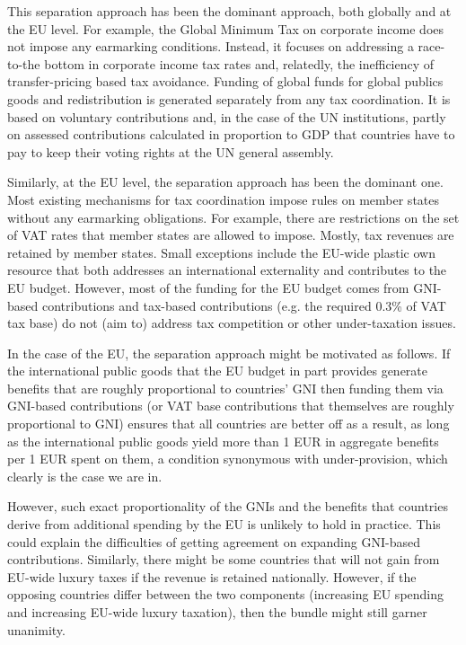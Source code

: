 \documentclass{article}
\begin{document}
This separation approach has been the dominant approach, both globally and at the EU level. For example, the Global Minimum Tax on corporate income does not impose any earmarking conditions. Instead, it focuses on addressing a race-to-the bottom in corporate income tax rates and, relatedly, the inefficiency of transfer-pricing based tax avoidance. Funding of global funds for global publics goods and redistribution is generated separately from any tax coordination. It is based on voluntary contributions and, in the case of the UN institutions, partly on assessed contributions calculated in proportion to GDP that countries have to pay to keep their voting rights at the UN general assembly.

Similarly, at the EU level, the separation approach has been the dominant one. Most existing mechanisms for tax coordination impose rules on member states without any earmarking obligations. For example, there are restrictions on the set of VAT rates that member states are allowed to impose. Mostly, tax revenues are retained by member states. Small exceptions include the EU-wide plastic own resource that both addresses an international externality and contributes to the EU budget. However, most of the funding for the EU budget comes from GNI-based contributions and tax-based contributions (e.g. the required 0.3\% of VAT tax base) do not (aim to) address tax competition or other under-taxation issues.

In the case of the EU, the separation approach might be motivated as follows. If the international public goods that the EU budget in part provides generate benefits that are roughly proportional to countries' GNI then funding them via GNI-based contributions (or VAT base contributions that themselves are roughly proportional to GNI) ensures that all countries are better off as a result, as long as the international public goods yield more than 1 EUR in aggregate benefits per 1 EUR spent on them, a condition synonymous with under-provision, which clearly is the case we are in.

However, such exact proportionality of the GNIs and the benefits that countries derive from additional spending by the EU is unlikely to hold in practice. This could explain the difficulties of getting agreement on expanding GNI-based contributions. Similarly, there might be some countries that will not gain from EU-wide luxury taxes if the revenue is retained nationally. However, if the opposing countries differ between the two components (increasing EU spending and increasing EU-wide luxury taxation), then the bundle might still garner unanimity. %
\end{document}
